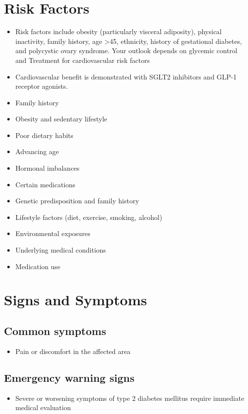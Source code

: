 \section{Risk Factors}
\begin{itemize}[noitemsep]
  \item Risk factors include obesity (particularly visceral adiposity), physical inactivity, family history, age >45, ethnicity, history of gestational diabetes, and polycystic ovary syndrome. Your outlook depends on glycemic control and Treatment for cardiovascular risk factors
  \item Cardiovascular benefit is demonstrated with SGLT2 inhibitors and GLP-1 receptor agonists.
  \item Family history
  \item Obesity and sedentary lifestyle
  \item Poor dietary habits
  \item Advancing age
  \item Hormonal imbalances
  \item Certain medications
  \item Genetic predisposition and family history
  \item Lifestyle factors (diet, exercise, smoking, alcohol)
  \item Environmental exposures
  \item Underlying medical conditions
  \item Medication use
\end{itemize}
\section{Signs and Symptoms}

\subsection{Common symptoms}
\begin{itemize}[noitemsep]
  \item Pain or discomfort in the affected area
  \end{itemize}

\subsection{Emergency warning signs}
\begin{itemize}[noitemsep]
  \item Severe or worsening symptoms of type 2 diabetes mellitus require immediate medical evaluation
\end{itemize}
